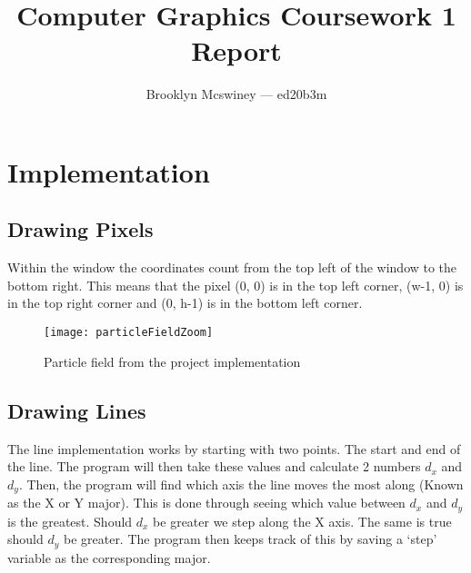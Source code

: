 \documentclass[
	a4paper, %
	10pt, %
]{CSUniSchoolLabReport}
\newcommand{\subtitle}[1]{%
  \posttitle{%
    \par\end{center}
    \begin{center}\large#1\end{center}
    \vskip0.5em}%
}
\begin{document}
\title{Computer Graphics Coursework 1 Report} %
\subtitle{COMP3811}
\author{Brooklyn Mcswiney --- ed20b3m} %

\date{ }

\maketitle %

\noindent\makebox[\linewidth]{\rule{\paperwidth}{0.4pt}}

\tableofcontents

\pagebreak

\section{Implementation}

\subsection{Drawing Pixels}

Within the window the coordinates count from the top left of the window
to the bottom right. This means that the pixel (0, 0) is in the top left
corner, (w-1, 0) is in the top right corner and (0, h-1) is in the 
bottom left corner.

\begin{figure}[h]
	\centering
	\texttt{[image: particleFieldZoom]}
	\caption{Particle field from the project implementation}
\end{figure}

\subsection{Drawing Lines}
\begin{flushleft}
	The line implementation works by starting with two points. The start and
	end of the line. The program will then take these values and calculate 2
	numbers \(d_x\) and \( d_y\). Then, the program will find which axis the
	line moves the most along (Known as the X or Y major). This is done through
	seeing which value between \(d_x\) and \( d_y\) is the greatest. Should \(d_x\)
	be greater we step along the X axis. The same is true should \(d_y\) be greater.
	The program then keeps track of this by saving a `step' variable as the corresponding 
	major.
\end{flushleft}
\end{document}
